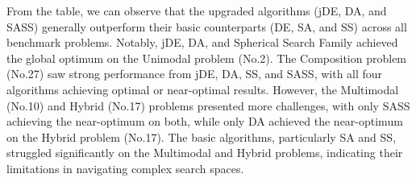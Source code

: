 \documentclass{article}
\begin{document}
\noindent{}
\vspace{0.5cm}

From the table, we can observe that the upgraded algorithms (jDE, DA, and SASS) generally outperform their basic counterparts (DE, SA, and SS) across all benchmark problems. Notably, jDE, DA, and Spherical Search Family achieved the global optimum on the Unimodal problem (No.2). The Composition problem (No.27) saw strong performance from jDE, DA, SS, and SASS, with all four algorithms achieving optimal or near-optimal results. However, the Multimodal (No.10) and Hybrid (No.17) problems presented more challenges, with only SASS achieving the near-optimum on both, while only DA achieved the near-optimum on the Hybrid problem (No.17). The basic algorithms, particularly SA and SS, struggled significantly on the Multimodal and Hybrid problems, indicating their limitations in navigating complex search spaces.
\end{document}
